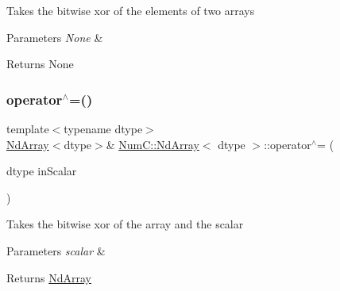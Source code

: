 Takes the bitwise xor of the elements of two arrays


\begin{DoxyParams}{Parameters}
{\em None} & \\
\hline
\end{DoxyParams}
\begin{DoxyReturn}{Returns}
None 
\end{DoxyReturn}
\mbox{\label{class_num_c_1_1_nd_array_ae3000c505b1b440b8d155bbb7c328b40}} 
\subsubsection{\texorpdfstring{operator$^\wedge$=()}{operator^=()}\hspace{0.1cm}{\footnotesize\ttfamily [2/2]}}
{\footnotesize\ttfamily template$<$typename dtype$>$ \\
\mbox{\hyperlink{class_num_c_1_1_nd_array}{Nd\+Array}}$<$dtype$>$\& \mbox{\hyperlink{class_num_c_1_1_nd_array}{Num\+C\+::\+Nd\+Array}}$<$ dtype $>$\+::operator$^\wedge$= (\begin{DoxyParamCaption}\item[{dtype}]{in\+Scalar }\end{DoxyParamCaption})\hspace{0.3cm}{\ttfamily [inline]}}

Takes the bitwise xor of the array and the scalar


\begin{DoxyParams}{Parameters}
{\em scalar} & \\
\hline
\end{DoxyParams}
\begin{DoxyReturn}{Returns}
\mbox{\hyperlink{class_num_c_1_1_nd_array}{Nd\+Array}} 
\end{DoxyReturn}
\mbox{\label{class_num_c_1_1_nd_array_a9245e3c47205fbdcd4f8e616d6930e38}} 
